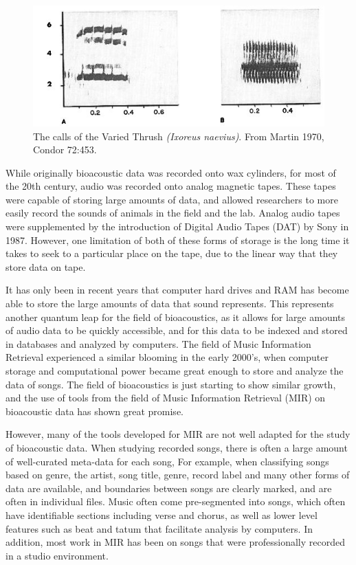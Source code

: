 \documentclass[12pt,oneside]{book}
\begin{document}
\begin{figure}[t]
\centering
\includegraphics[width=\columnwidth]{figures/sonagraph2}
\caption{The calls of the Varied Thrush \textit{(Ixoreus
    naevius)}. From Martin 1970, Condor 72:453.}
\label{fig:sonagraph1}
\end{figure}

While originally bioacoustic data was recorded onto wax cylinders, for
most of the 20th century, audio was recorded onto analog magnetic
tapes.  These tapes were capable of storing large amounts of data, and
allowed researchers to more easily record the sounds of animals in the
field and the lab.  Analog audio tapes were supplemented by the
introduction of Digital Audio Tapes (DAT) by Sony in 1987.  However,
one limitation of both of these forms of storage is the long time it
takes to seek to a particular place on the tape, due to the linear way
that they store data on tape.

It has only been in recent years that computer hard drives and RAM has
become able to store the large amounts of data that sound represents.
This represents another quantum leap for the field of bioacoustics, as
it allows for large amounts of audio data to be quickly accessible,
and for this data to be indexed and stored in databases and analyzed
by computers.  The field of Music Information Retrieval experienced a
similar blooming in the early 2000's, when computer storage and
computational power became great enough to store and analyze the data
of songs.  The field of bioacoustics is just starting to show similar
growth, and the use of tools from the field of Music Information
Retrieval (MIR) on bioacoustic data has shown great promise.

However, many of the tools developed for MIR are not well adapted for
the study of bioacoustic data.  When studying recorded songs, there is
often a large amount of well-curated meta-data for each song, For
example, when classifying songs based on genre, the artist, song
title, genre, record label and many other forms of data are available,
and boundaries between songs are clearly marked, and are often in
individual files.  Music often come pre-segmented into songs, which
often have identifiable sections including verse and chorus, as well
as lower level features such as beat and tatum that facilitate
analysis by computers.  In addition, most work in MIR has been on
songs that were professionally recorded in a studio environment.
\end{document}
